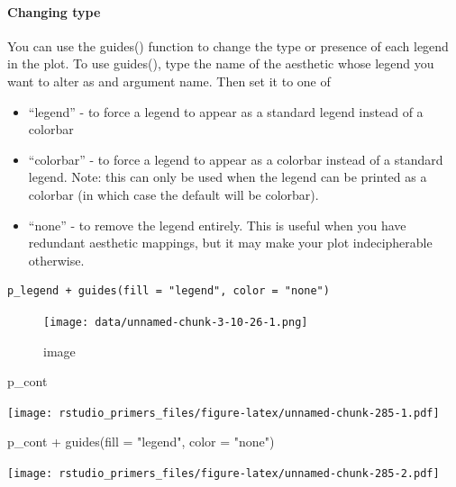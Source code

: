 \documentclass[
]{article}
\newenvironment{Shaded}{\begin{snugshade}}{\end{snugshade}}
\newcommand{\AttributeTok}[1]{\textcolor[rgb]{0.77,0.63,0.00}{#1}}
\newcommand{\FunctionTok}[1]{\textcolor[rgb]{0.00,0.00,0.00}{#1}}
\newcommand{\NormalTok}[1]{#1}
\newcommand{\SpecialCharTok}[1]{\textcolor[rgb]{0.00,0.00,0.00}{#1}}
\newcommand{\StringTok}[1]{\textcolor[rgb]{0.31,0.60,0.02}{#1}}
\providecommand{\tightlist}{%
  \setlength{\itemsep}{0pt}\setlength{\parskip}{0pt}}
\begin{document}
\hypertarget{changing-type}{%
\paragraph{Changing type}\label{changing-type}}

You can use the guides() function to change the type or presence of each
legend in the plot. To use guides(), type the name of the aesthetic
whose legend you want to alter as and argument name. Then set it to one
of

\begin{itemize}
\tightlist
\item
  ``legend'' - to force a legend to appear as a standard legend instead
  of a colorbar
\item
  ``colorbar'' - to force a legend to appear as a colorbar instead of a
  standard legend. Note: this can only be used when the legend can be
  printed as a colorbar (in which case the default will be colorbar).
\item
  ``none'' - to remove the legend entirely. This is useful when you have
  redundant aesthetic mappings, but it may make your plot indecipherable
  otherwise.
\end{itemize}

\begin{verbatim}
p_legend + guides(fill = "legend", color = "none")
\end{verbatim}

\begin{figure}
\centering
\texttt{[image: data/unnamed-chunk-3-10-26-1.png]}
\caption{image}
\end{figure}

\begin{Shaded}
\begin{Highlighting}[]
\NormalTok{p\_cont}
\end{Highlighting}
\end{Shaded}

\texttt{[image: rstudio\_primers\_files/figure-latex/unnamed-chunk-285-1.pdf]}

\begin{Shaded}
\begin{Highlighting}[]
\NormalTok{p\_cont }\SpecialCharTok{+} \FunctionTok{guides}\NormalTok{(}\AttributeTok{fill =} \StringTok{"legend"}\NormalTok{, }\AttributeTok{color =} \StringTok{"none"}\NormalTok{)}
\end{Highlighting}
\end{Shaded}

\texttt{[image: rstudio\_primers\_files/figure-latex/unnamed-chunk-285-2.pdf]}
\end{document}
